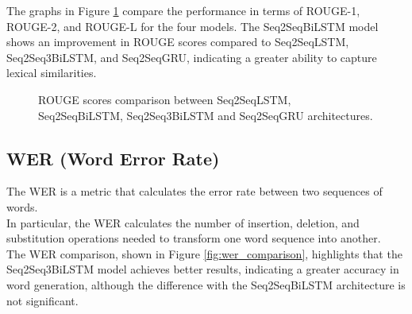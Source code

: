 The graphs in Figure \ref{fig:rouge_comparison} compare the performance in terms of ROUGE-1, ROUGE-2, and ROUGE-L for the four models. The Seq2SeqBiLSTM model shows an improvement in ROUGE scores compared to Seq2SeqLSTM, Seq2Seq3BiLSTM, and Seq2SeqGRU, indicating a greater ability to capture lexical similarities.
\begin{figure}[H]
    \centering
    \hfill
    \hfill
    \hfill
    \hfill

    \hfill
    \hfill
    \hfill
    \hfill

    \hfill
    \hfill
    \hfill
    \hfill

    \caption{ROUGE scores comparison between Seq2SeqLSTM, Seq2SeqBiLSTM, Seq2Seq3BiLSTM and Seq2SeqGRU architectures.}
    \label{fig:rouge_comparison}
\end{figure}

\subsection{WER (Word Error Rate)}
The WER is a metric that calculates the error rate between two sequences of words.\\
In particular, the WER calculates the number of insertion, deletion, and substitution operations needed to transform one word sequence into another.\\

The WER comparison, shown in Figure \ref{fig:wer_comparison}, highlights that the Seq2Seq3BiLSTM model achieves better results, indicating a greater accuracy in word generation, although the difference with the Seq2SeqBiLSTM architecture is not significant.\\

